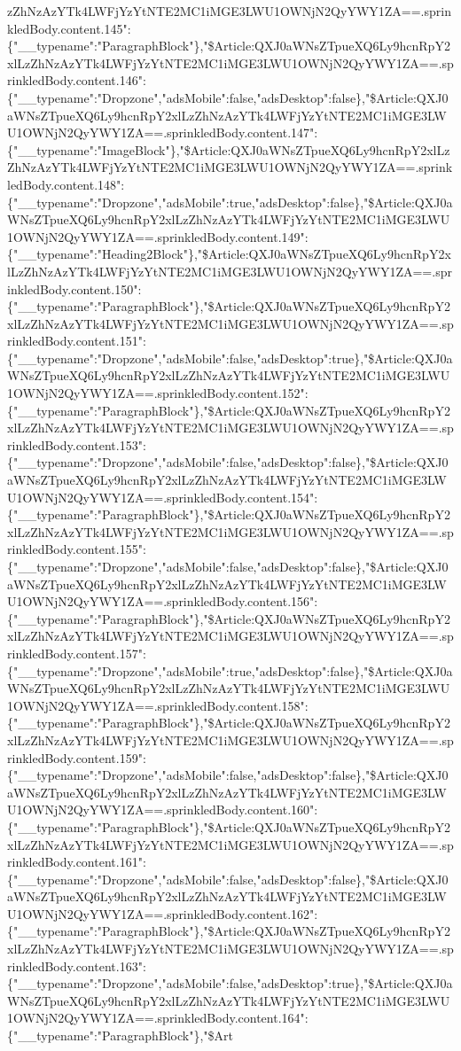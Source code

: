 zZhNzAzYTk4LWFjYzYtNTE2MC1iMGE3LWU1OWNjN2QyYWY1ZA==.sprinkledBody.content.145":\{"\_\_typename":"ParagraphBlock"\},"\$Article:QXJ0aWNsZTpueXQ6Ly9hcnRpY2xlLzZhNzAzYTk4LWFjYzYtNTE2MC1iMGE3LWU1OWNjN2QyYWY1ZA==.sprinkledBody.content.146":\{"\_\_typename":"Dropzone","adsMobile":false,"adsDesktop":false\},"\$Article:QXJ0aWNsZTpueXQ6Ly9hcnRpY2xlLzZhNzAzYTk4LWFjYzYtNTE2MC1iMGE3LWU1OWNjN2QyYWY1ZA==.sprinkledBody.content.147":\{"\_\_typename":"ImageBlock"\},"\$Article:QXJ0aWNsZTpueXQ6Ly9hcnRpY2xlLzZhNzAzYTk4LWFjYzYtNTE2MC1iMGE3LWU1OWNjN2QyYWY1ZA==.sprinkledBody.content.148":\{"\_\_typename":"Dropzone","adsMobile":true,"adsDesktop":false\},"\$Article:QXJ0aWNsZTpueXQ6Ly9hcnRpY2xlLzZhNzAzYTk4LWFjYzYtNTE2MC1iMGE3LWU1OWNjN2QyYWY1ZA==.sprinkledBody.content.149":\{"\_\_typename":"Heading2Block"\},"\$Article:QXJ0aWNsZTpueXQ6Ly9hcnRpY2xlLzZhNzAzYTk4LWFjYzYtNTE2MC1iMGE3LWU1OWNjN2QyYWY1ZA==.sprinkledBody.content.150":\{"\_\_typename":"ParagraphBlock"\},"\$Article:QXJ0aWNsZTpueXQ6Ly9hcnRpY2xlLzZhNzAzYTk4LWFjYzYtNTE2MC1iMGE3LWU1OWNjN2QyYWY1ZA==.sprinkledBody.content.151":\{"\_\_typename":"Dropzone","adsMobile":false,"adsDesktop":true\},"\$Article:QXJ0aWNsZTpueXQ6Ly9hcnRpY2xlLzZhNzAzYTk4LWFjYzYtNTE2MC1iMGE3LWU1OWNjN2QyYWY1ZA==.sprinkledBody.content.152":\{"\_\_typename":"ParagraphBlock"\},"\$Article:QXJ0aWNsZTpueXQ6Ly9hcnRpY2xlLzZhNzAzYTk4LWFjYzYtNTE2MC1iMGE3LWU1OWNjN2QyYWY1ZA==.sprinkledBody.content.153":\{"\_\_typename":"Dropzone","adsMobile":false,"adsDesktop":false\},"\$Article:QXJ0aWNsZTpueXQ6Ly9hcnRpY2xlLzZhNzAzYTk4LWFjYzYtNTE2MC1iMGE3LWU1OWNjN2QyYWY1ZA==.sprinkledBody.content.154":\{"\_\_typename":"ParagraphBlock"\},"\$Article:QXJ0aWNsZTpueXQ6Ly9hcnRpY2xlLzZhNzAzYTk4LWFjYzYtNTE2MC1iMGE3LWU1OWNjN2QyYWY1ZA==.sprinkledBody.content.155":\{"\_\_typename":"Dropzone","adsMobile":false,"adsDesktop":false\},"\$Article:QXJ0aWNsZTpueXQ6Ly9hcnRpY2xlLzZhNzAzYTk4LWFjYzYtNTE2MC1iMGE3LWU1OWNjN2QyYWY1ZA==.sprinkledBody.content.156":\{"\_\_typename":"ParagraphBlock"\},"\$Article:QXJ0aWNsZTpueXQ6Ly9hcnRpY2xlLzZhNzAzYTk4LWFjYzYtNTE2MC1iMGE3LWU1OWNjN2QyYWY1ZA==.sprinkledBody.content.157":\{"\_\_typename":"Dropzone","adsMobile":true,"adsDesktop":false\},"\$Article:QXJ0aWNsZTpueXQ6Ly9hcnRpY2xlLzZhNzAzYTk4LWFjYzYtNTE2MC1iMGE3LWU1OWNjN2QyYWY1ZA==.sprinkledBody.content.158":\{"\_\_typename":"ParagraphBlock"\},"\$Article:QXJ0aWNsZTpueXQ6Ly9hcnRpY2xlLzZhNzAzYTk4LWFjYzYtNTE2MC1iMGE3LWU1OWNjN2QyYWY1ZA==.sprinkledBody.content.159":\{"\_\_typename":"Dropzone","adsMobile":false,"adsDesktop":false\},"\$Article:QXJ0aWNsZTpueXQ6Ly9hcnRpY2xlLzZhNzAzYTk4LWFjYzYtNTE2MC1iMGE3LWU1OWNjN2QyYWY1ZA==.sprinkledBody.content.160":\{"\_\_typename":"ParagraphBlock"\},"\$Article:QXJ0aWNsZTpueXQ6Ly9hcnRpY2xlLzZhNzAzYTk4LWFjYzYtNTE2MC1iMGE3LWU1OWNjN2QyYWY1ZA==.sprinkledBody.content.161":\{"\_\_typename":"Dropzone","adsMobile":false,"adsDesktop":false\},"\$Article:QXJ0aWNsZTpueXQ6Ly9hcnRpY2xlLzZhNzAzYTk4LWFjYzYtNTE2MC1iMGE3LWU1OWNjN2QyYWY1ZA==.sprinkledBody.content.162":\{"\_\_typename":"ParagraphBlock"\},"\$Article:QXJ0aWNsZTpueXQ6Ly9hcnRpY2xlLzZhNzAzYTk4LWFjYzYtNTE2MC1iMGE3LWU1OWNjN2QyYWY1ZA==.sprinkledBody.content.163":\{"\_\_typename":"Dropzone","adsMobile":false,"adsDesktop":true\},"\$Article:QXJ0aWNsZTpueXQ6Ly9hcnRpY2xlLzZhNzAzYTk4LWFjYzYtNTE2MC1iMGE3LWU1OWNjN2QyYWY1ZA==.sprinkledBody.content.164":\{"\_\_typename":"ParagraphBlock"\},"\$Art